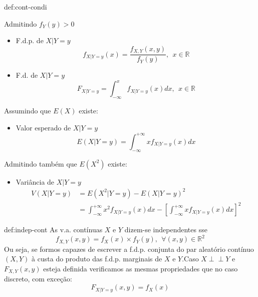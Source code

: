\begin{theo}{def:cont-condi}\label{def:cont-condi}

    \noindent Admitindo $f_Y(y) > 0$ 
    \begin{itemize}
        \item F.d.p. de $X | Y = y$
        $$
            f_{X | Y = y}(x) = \dfrac{f_{X,Y}(x,y)}{f_Y(y)},\;\, x \in \mathbb{R}
        $$
        \item F.d. de $X | Y = y$
        $$
            F_{X | Y = y} = \int_{-\infty}^x f_{X | Y = y}(x) dx,\;\, x \in \mathbb{R}
        $$
    \end{itemize}

    \vspace{-0.5 em}
    \noindent Assumindo que $E(X)$ existe:
    \begin{itemize}
        \item Valor esperado de $X | Y = y$
        $$
            E(X | Y = y) = \int_{-\infty}^{+\infty} x f_{X | Y = y}(x)dx
        $$
    \end{itemize}

    \vspace{-0.5 em}
    \noindent Admitindo também que $E(X^2)$ existe:
    \begin{itemize}
        \item Variância de $X | Y = y$
        \begin{align*}
            V(X | Y = y) &= E(X^2 | Y = y) - E(X | Y = y)^2\\
            &= \int_{-\infty}^{+\infty} x^2 f_{X | Y = y}(x) dx - \left[\int_{-\infty}^{+\infty} x f_{X | Y = y}(x) dx\right]^2
        \end{align*}
    \end{itemize}
\end{theo}

\vspace{-0.5 em}
\begin{theo}{def:indep-cont}\label{def:indep-cont}
    As v.a. contínuas $X$ e $Y$ dizem-se independentes sse
    $$
        f_{X,Y}(x,y) = f_X(x) \times f_Y(y),\;\, \forall (x,y) \in \mathbb{R}^2
    $$
    \noindent Ou seja, se formos capazes de escrever a f.d.p. conjunta do par aleatório contínuo $(X,Y)$ à custa do produto das f.d.p. marginais de $X$ e $Y$.Caso  $X\perp \!\!\! \perp Y$ e $F_{X,Y}(x,y)$ esteja definida verificamos as mesmas propriedades que no caso discreto, com exceção: 
    $$
        F_{X|Y=y}(x,y) = f_X(x)
    $$ 
\end{theo}
